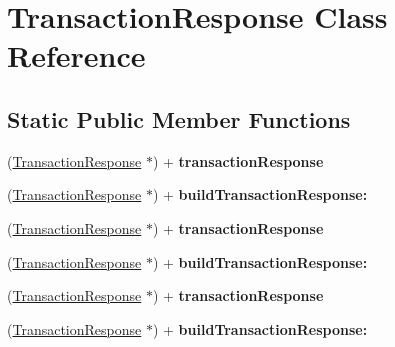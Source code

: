 \hypertarget{interface_transaction_response}{
\section{TransactionResponse Class Reference}
\label{interface_transaction_response}
}
\subsection*{Static Public Member Functions}
\begin{DoxyCompactItemize}
\item 
\hypertarget{interface_transaction_response_a89cf7057067df97f2b796f21494287a0}{
(\hyperlink{interface_transaction_response}{TransactionResponse} $\ast$) + {\bfseries transactionResponse}}
\label{interface_transaction_response_a89cf7057067df97f2b796f21494287a0}

\item 
\hypertarget{interface_transaction_response_a208f003a4ad11a962e032b6275b7c230}{
(\hyperlink{interface_transaction_response}{TransactionResponse} $\ast$) + {\bfseries buildTransactionResponse:}}
\label{interface_transaction_response_a208f003a4ad11a962e032b6275b7c230}

\item 
\hypertarget{interface_transaction_response_a89cf7057067df97f2b796f21494287a0}{
(\hyperlink{interface_transaction_response}{TransactionResponse} $\ast$) + {\bfseries transactionResponse}}
\label{interface_transaction_response_a89cf7057067df97f2b796f21494287a0}

\item 
\hypertarget{interface_transaction_response_a208f003a4ad11a962e032b6275b7c230}{
(\hyperlink{interface_transaction_response}{TransactionResponse} $\ast$) + {\bfseries buildTransactionResponse:}}
\label{interface_transaction_response_a208f003a4ad11a962e032b6275b7c230}

\item 
\hypertarget{interface_transaction_response_a89cf7057067df97f2b796f21494287a0}{
(\hyperlink{interface_transaction_response}{TransactionResponse} $\ast$) + {\bfseries transactionResponse}}
\label{interface_transaction_response_a89cf7057067df97f2b796f21494287a0}

\item 
\hypertarget{interface_transaction_response_a208f003a4ad11a962e032b6275b7c230}{
(\hyperlink{interface_transaction_response}{TransactionResponse} $\ast$) + {\bfseries buildTransactionResponse:}}
\label{interface_transaction_response_a208f003a4ad11a962e032b6275b7c230}

\end{DoxyCompactItemize}
